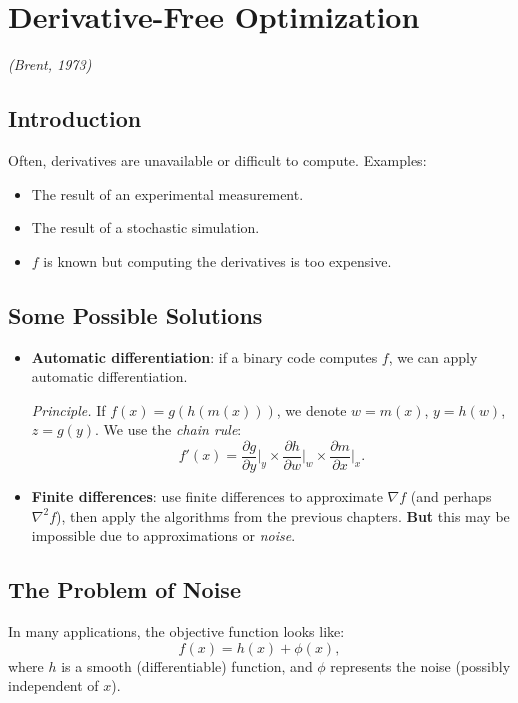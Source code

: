 \chapter{Derivative-Free Optimization}
\label{chap:derivative-free}
\textit{(Brent, 1973)}

\section{Introduction}

Often, derivatives are unavailable or difficult to compute.
Examples:
\begin{itemize}
    \item The result of an experimental measurement.
    \item The result of a stochastic simulation.
    \item $f$ is known but computing the derivatives is too expensive.
\end{itemize}

\section{Some Possible Solutions}

\begin{itemize}
    \item \textbf{Automatic differentiation}: if a binary code computes $f$, we can apply automatic differentiation.
    
    \textit{Principle.} If $f(x) = g(h(m(x)))$, we denote $w = m(x)$, $y = h(w)$, $z = g(y)$.
    We use the \textit{chain rule}:
    \[
        f'(x) = \frac{\partial g}{\partial y} \bigg|_y \times \frac{\partial h}{\partial w} \bigg|_w \times \frac{\partial m}{\partial x} \bigg|_x.
    \]

    \item \textbf{Finite differences}: use finite differences to approximate $\nabla f$ (and perhaps $\nabla^2 f$), then apply the algorithms from the previous chapters.
    \textbf{But} this may be impossible due to approximations or \textit{noise}.
\end{itemize}

\section{The Problem of Noise}

In many applications, the objective function looks like:
\begin{equation}
    f(x) = h(x) + \phi(x),
\end{equation}
where $h$ is a smooth (differentiable) function, and $\phi$ represents the noise (possibly independent of $x$).

